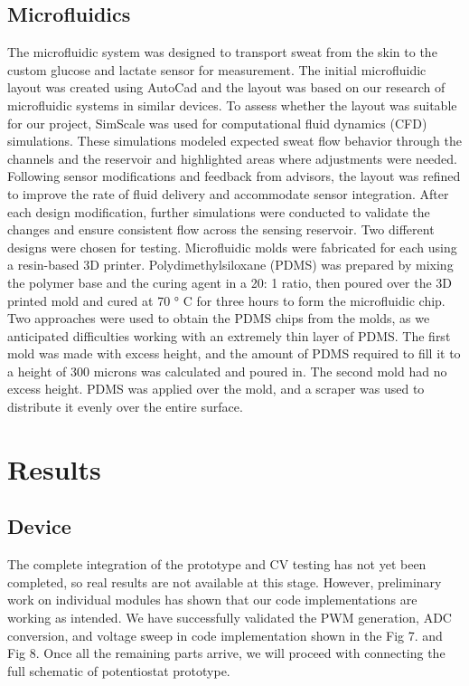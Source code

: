 \documentclass[conference]{IEEEtran}
\begin{document}
\subsection{Microfluidics}
The microfluidic system was designed to transport sweat from the skin to the custom glucose and lactate sensor for measurement. The initial microfluidic layout was created using AutoCad and the layout was based on our research of microfluidic systems in similar devices. To assess whether the layout was suitable for our project, SimScale was used for computational fluid dynamics (CFD) simulations. These simulations modeled expected sweat flow behavior through the channels and the reservoir and highlighted areas where adjustments were needed.
Following sensor modifications and feedback from advisors, the layout was refined to improve the rate of fluid delivery and accommodate sensor integration. After each design modification, further simulations were conducted to validate the changes and ensure consistent flow across the sensing reservoir.
Two different designs were chosen for testing. Microfluidic molds were fabricated for each using a resin-based 3D printer. Polydimethylsiloxane (PDMS) was prepared by mixing the polymer base and the curing agent in a 20: 1 ratio, then poured over the 3D printed mold and cured at 70 ° C for three hours to form the microfluidic chip. Two approaches were used to obtain the PDMS chips from the molds, as we anticipated difficulties working with an extremely thin layer of PDMS. The first mold was made with excess height, and the amount of PDMS required to fill it to a height of 300 microns was calculated and poured in. The second mold had no excess height. PDMS was applied over the mold, and a scraper was used to distribute it evenly over the entire surface.
\bigskip

\section{Results}

\smallskip

\subsection{Device}
The complete integration of the prototype and CV testing has not yet been completed, so real results are not available at this stage. However, preliminary work on individual modules has shown that our code implementations are working as intended. We have successfully validated the PWM generation, ADC conversion, and voltage sweep in code implementation shown in the Fig 7. and Fig 8. Once all the remaining parts arrive, we will proceed with connecting the full schematic of potentiostat prototype. 
\end{document}
